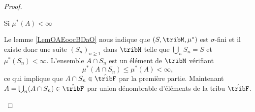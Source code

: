 \begin{proof}
\begin{subproof}
        \item[Si \( \mu^*(A)<\infty\)] 

            Le lemme \ref{LemOAEoocBDaO} nous indique que \( (S,\tribM,\mu^*)\) est \( \sigma\)-fini et il existe donc une suite \( (S_n)_{n\geq 1}\) dans \( \tribM\) telle que \( \bigcup_nS_n=S\) et \( \mu^*(S_n)<\infty\). L'ensemble \( A\cap S_n\) est un élément de \( \tribM\) vérifiant
            \begin{equation}
                \mu^*(A\cap S_n)\leq \mu^*(A)<\infty,
            \end{equation}
            ce qui implique que \( A\cap S_n\in\hat\tribF\) par la première partie. Maintenant \( A=\bigcup_n(A\cap S_n)\in\hat\tribF\) par union dénombrable d'éléments de la tribu \( \hat\tribF\).
    \end{subproof}
\end{proof}
